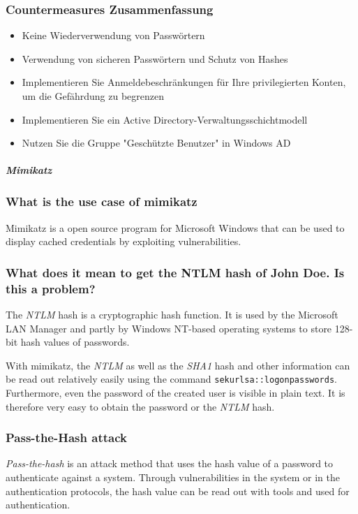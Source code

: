 \subsubsection{Countermeasures Zusammenfassung}
\begin{itemize}
    \item Keine Wiederverwendung von Passwörtern
    \item Verwendung von sicheren Passwörtern und Schutz von Hashes
    \item Implementieren Sie Anmeldebeschränkungen für Ihre privilegierten Konten, um die Gefährdung zu begrenzen
    \item Implementieren Sie ein Active Directory-Verwaltungsschichtmodell
    \item Nutzen Sie die Gruppe "Geschützte Benutzer" in Windows AD
\end{itemize}


\subparagraph{Mimikatz}
\subsubsection{What is the use case of mimikatz}
Mimikatz is a open source program for Microsoft Windows that can be used to display cached credentials by exploiting vulnerabilities.

\subsubsection{What does it mean to get the NTLM hash of John Doe. Is this a problem?}
The \textit{NTLM} hash is a cryptographic hash function. It is used by the Microsoft LAN Manager and partly by Windows NT-based operating systems to store 128-bit hash values of passwords.

With mimikatz, the \textit{NTLM} as well as the \textit{SHA1} hash and other information can be read out relatively easily using the command \lstinline|sekurlsa::logonpasswords|. Furthermore, even the password of the created user is visible in plain text. It is therefore very easy to obtain the password or the \textit{NTLM} hash.

\subsubsection{Pass-the-Hash attack}
\textit{Pass-the-hash} is an attack method that uses the hash value of a password to authenticate against a system. Through vulnerabilities in the system or in the authentication protocols, the hash value can be read out with tools and used for authentication.

